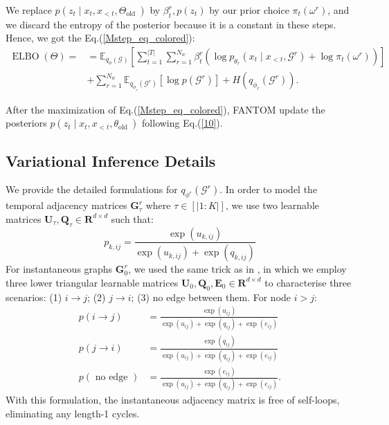 We replace $p\left(z_t \mid x_t, x_{<t}, \Theta_{\text {old }}\right)$ by $\beta_t^r, p\left(z_t\right)$ by our prior choice $\pi_t\left(\omega^r\right)$, and we discard the entropy of the posterior because it is a constant in these steps. Hence, we got the Eq.(\ref{Mstep_eq_colored}):
\begin{equation}
\begin{aligned}
\operatorname{ELBO}(\Theta)=&=\mathbb{E}_{q_\phi(\mathcal{G})}\left[\sum_{t=1}^{|T|} \sum_{r=1}^{N_w} \beta_t^r\left(\log p_{\theta_r}\left(x_t \mid x_{<t}, \mathcal{G}^r\right)+\log \pi_t\left(\omega^r\right)\right)\right]\\
&+\sum_{r=1}^{N_w} \mathbb{E}_{q_{\phi_r}\left(\mathcal{G}^r\right)}\left[\log p\left(\mathcal{G}^r\right)\right]+H\left(q_{\phi_r}\left(\mathcal{G}^r\right)\right).
\end{aligned}
\end{equation}


After the maximization of Eq.(\ref{Mstep_eq_colored}), FANTOM update the posteriors $p\left(z_t \mid x_t, x_{<t}, \theta_{\text {old }}\right)$ following Eq.(\ref{10}).




\subsection{Variational Inference Details}
We provide the detailed formulations for $q_{\phi^r}(\mathcal{G}^r)$. In order to model the temporal adjacency matrices $\boldsymbol{G}_{\tau}^r$ where $\tau \in [|1:K|]$, we use two learnable matrices $\boldsymbol{U}_{\tau}, \boldsymbol{Q}_{\tau} \in \mathbf{R}^{d\times d}$ such that:
\begin{equation}
p_{k, i j}=\frac{\exp \left(u_{k, i j}\right)}{\exp \left(u_{k, i j}\right)+\exp \left(q_{k, i j}\right)}
\end{equation}
For instantaneous graphs $\boldsymbol{G}_0^r$, we used the same trick as in \cite{gong2022rhino, varambally2023discovering}, in which we employ three lower triangular learnable matrices $\boldsymbol{U}_{0}, \boldsymbol{Q}_{0}, \boldsymbol{E}_{0} \in \mathbf{R}^{d\times d}$ to characterise three scenarios: (1) $i \rightarrow j$; (2) $j \rightarrow i$; (3) no edge between them. For node $i>j$:
\begin{equation}
\begin{aligned}
p(i \rightarrow j) & =\frac{\exp \left(u_{i j}\right)}{\exp \left(u_{i j}\right)+\exp \left(q_{i j}\right)+\exp \left(e_{i j}\right)} \\
p(j \rightarrow i) & =\frac{\exp \left(q_{i j}\right)}{\exp \left(u_{i j}\right)+\exp \left(q_{i j}\right)+\exp \left(e_{i j}\right)} \\
p(\text { no edge }) & =\frac{\exp \left(e_{i j}\right)}{\exp \left(u_{i j}\right)+\exp \left(q_{i j}\right)+\exp \left(e_{i j}\right)} .
\end{aligned}
\end{equation}
With this formulation, the instantaneous adjacency matrix is free of self-loops, eliminating any length-1 cycles.